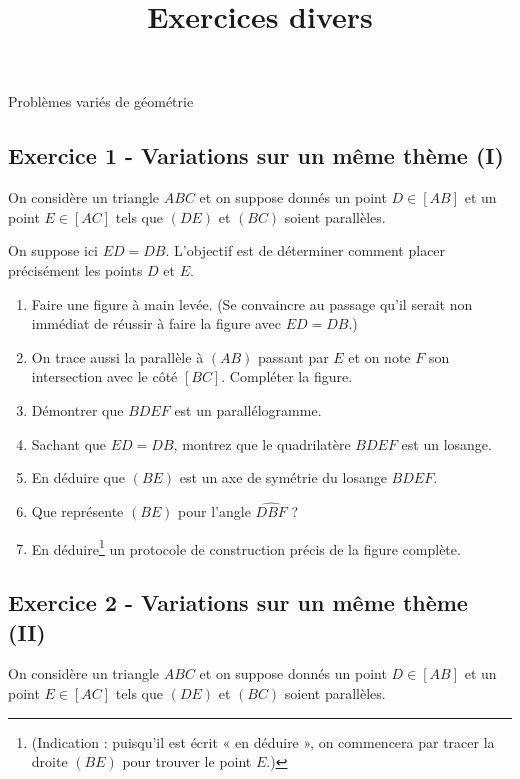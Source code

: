 \documentclass[12 pt]{extarticle}
\title{Exercices divers}
\date{}
\theoremstyle{plain}
\begin{document}
\begin{center}{\Large Problèmes variés de géométrie\\}
 \end{center} 
 
\subsection*{Exercice 1 - Variations sur un même thème (I)}
 
On considère un triangle $ABC$ et on suppose donnés un point $D\in[AB]$ et un point $E\in[AC]$ tels que $(DE)$ et $(BC)$ soient parallèles. 

On suppose ici $ED=DB$. L'objectif est de déterminer comment placer précisément les points $D$ et $E$. 

\begin{enumerate}
\item Faire une figure à main levée. (Se convaincre au passage qu'il serait
non immédiat de réussir à faire la figure avec $ED=DB$.)

\item On trace aussi la parallèle à $(AB)$ passant par $E$ et on note $F$
son intersection avec le côté $[BC]$. Compléter la figure. 

\item Démontrer que $BDEF$ est un parallélogramme. 

\item Sachant que $ED=DB$, montrez que le quadrilatère $BDEF$ est un losange. 

\item En déduire que $(BE)$ est un axe de symétrie du losange $BDEF$. 

\item Que représente $(BE)$ pour l'angle $\widehat{DBF}$ ? 

\item En déduire\footnote{(Indication : puisqu'il est écrit « en déduire », on commencera par tracer la droite $(BE)$ pour trouver le point $E$.)} un protocole de construction précis de la figure complète.

\end{enumerate}
\subsection*{Exercice 2 - Variations sur un même thème (II)}
 
On considère un triangle $ABC$ et on suppose donnés un point $D\in[AB]$ et un point $E\in[AC]$ tels que $(DE)$ et $(BC)$ soient parallèles. 
\end{document}
